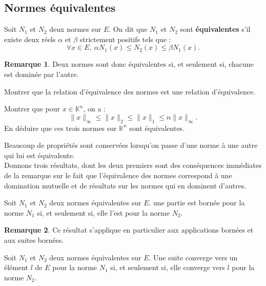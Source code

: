 \documentclass[french]{article}
\newcommand{\K}{\mathbb{K}}
\theoremstyle{plain}
\theoremstyle{definition}
\newtheorem*{rmq}{Remarque}
\theoremstyle{remark}
\begin{document}
\subsection{Normes équivalentes}

\begin{dfn}
	Soit $N_1$ et $N_2$ deux normes sur $E$. On dit que $N_1$ et $N_2$ sont \textbf{équivalentes} s'il existe deux réels $\alpha$ et $\beta$ strictement positifs tels que : $$\forall x\in E,\ \alpha N_1(x)\leqslant N_2(x)\leqslant\beta N_1(x).$$
\end{dfn}

\begin{rmq}
	Deux normes sont donc équivalentes si, et seulement si, chacune est dominée par l'autre.
\end{rmq}

\begin{exo}
	Montrer que la relation d'équivalence des normes est une relation d'équivalence.
\end{exo}

\begin{exo}
	Montrer que pour $x\in\K^n$, on a : $$\lVert x\rVert_\infty\leqslant\lVert x\rVert_2\leqslant\lVert x\rVert_1\leqslant n\lVert x\rVert_\infty.$$ En déduire que ces trois normes sur $\K^n$ sont équivalentes.
\end{exo}

Beaucoup de propriétés sont conservées lorsqu'on passe d'une norme à une autre qui lui est équivalente. \\
Donnons trois résultats, dont les deux premiers sont des conséquences immédiates de la remarque sur le fait que l'équivalence des normes correspond à une domination mutuelle et de résultats sur les normes qui en dominent d'autres.

\begin{prop}%
	Soit $N_1$ et $N_2$ deux normes équivalentes sur $E$. une partie est bornée pour la norme $N_1$ si, et seulement si, elle l'est pour la norme $N_2$.
\end{prop}

\begin{rmq}
	Ce résultat s'applique en particulier aux applications bornées et aux suites bornées.
\end{rmq}

\begin{prop}
	Soit $N_1$ et $N_2$ deux normes équivalentes sur $E$. Une suite converge vers un élément $l$ de $E$ pour la norme $N_1$ si, et seulement si, elle converge vers $l$ pour la norme $N_2$.
\end{prop}
\end{document}
